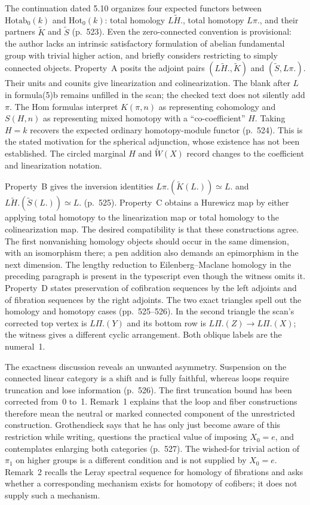The continuation dated 5.10 organizes four expected functors between $\mathrm{Hotab}_0(k)$ and $\mathrm{Hot}_0(k)$: total homology $L\widetilde H.$, total homotopy $L\pi.$, and their partners $\widetilde K$ and $\widetilde S$ (p.~523). Even the zero-connected convention is provisional: the author lacks an intrinsic satisfactory formulation of abelian fundamental group with trivial higher action, and briefly considers restricting to simply connected objects. Property~A posits the adjoint pairs $(L\widetilde H.,\widetilde K)$ and $(\widetilde S,L\pi.)$. Their units and counits give linearization and colinearization. The blank after $L$ in formula(5)b remains unfilled in the scan; the checked text does not silently add $\pi$. The Hom formulas interpret $K(\pi,n)$ as representing cohomology and $S(H,n)$ as representing mixed homotopy with a ``co-coefficient'' $H$. Taking $H=k$ recovers the expected ordinary homotopy-module functor (p.~524). This is the stated motivation for the spherical adjunction, whose existence has not been established. The circled marginal $H$ and $\widetilde W(X)$ record changes to the coefficient and linearization notation.

Property~B gives the inversion identities $L\pi.(\widetilde K(L.))\simeq L.$ and $L\widetilde H.(\widetilde S(L.))\simeq L.$ (p.~525). Property~C obtains a Hurewicz map by either applying total homotopy to the linearization map or total homology to the colinearization map. The desired compatibility is that these constructions agree. The first nonvanishing homology objects should occur in the same dimension, with an isomorphism there; a pen addition also demands an epimorphism in the next dimension. The lengthy reduction to Eilenberg--Maclane homology in the preceding paragraph is present in the typescript even though the witness omits it. Property~D states preservation of cofibration sequences by the left adjoints and of fibration sequences by the right adjoints. The two exact triangles spell out the homology and homotopy cases (pp.~525--526). In the second triangle the scan's corrected top vertex is $L\Pi.(Y)$ and its bottom row is $L\Pi.(Z)\to L\Pi.(X)$; the witness gives a different cyclic arrangement. Both oblique labels are the numeral~1.

The exactness discussion reveals an unwanted asymmetry. Suspension on the connected linear category is a shift and is fully faithful, whereas loops require truncation and lose information (p.~526). The first truncation bound has been corrected from~0 to~1. Remark~1 explains that the loop and fiber constructions therefore mean the neutral or marked connected component of the unrestricted construction. Grothendieck says that he has only just become aware of this restriction while writing, questions the practical value of imposing $X_0=e$, and contemplates enlarging both categories (p.~527). The wished-for trivial action of $\pi_1$ on higher groups is a different condition and is not supplied by $X_0=e$. Remark~2 recalls the Leray spectral sequence for homology of fibrations and asks whether a corresponding mechanism exists for homotopy of cofibers; it does not supply such a mechanism.


